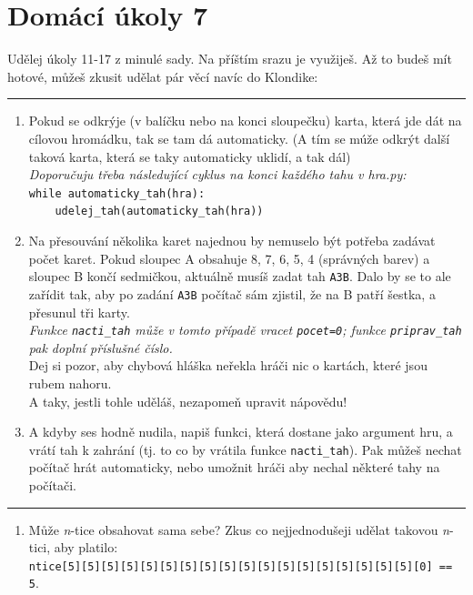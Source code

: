 \documentclass[a4paper,10pt]{article}
\newcommand\plsetno{7}
\begin{document}
\section*{Domácí úkoly \plsetno}

Udělej úkoly 11-17 z minulé sady. Na příštím srazu je využiješ.
Až to budeš mít hotové, můžeš zkusit udělat pár věcí navíc do Klondike:

\bigskip\bigskip
\hrule

\begin{enumerate}

\item Pokud se odkrýje (v balíčku nebo na konci sloupečku) karta, která jde dát
    na cílovou hromádku, tak se tam dá automaticky.
    (A tím se múže odkrýt další taková karta, která se taky automaticky
    uklidí, a tak dál)
    \\\emph{Doporučuju třeba následující cyklus na konci každého tahu v hra.py:}
    \\\verb+while automaticky_tah(hra):+
    \\\verb+    udelej_tah(automaticky_tah(hra))+

\item Na přesouvání několika karet najednou by nemuselo být potřeba zadávat
    počet karet. Pokud sloupec A obsahuje 8, 7, 6, 5, 4 (správných barev)
    a sloupec B končí sedmičkou, aktuálně musíš zadat tah \verb+A3B+.
    Dalo by se to ale zařídit tak, aby po zadání \verb+A3B+ počítač
    sám zjistil, že na B patří šestka, a přesunul tři karty.
    \\\emph{Funkce \texttt{nacti\_tah} může v tomto případě vracet \texttt{pocet=0};
            funkce \texttt{priprav\_tah} pak doplní příslušné číslo.}
    \\Dej si pozor, aby chybová hláška neřekla hráči nic o kartách, které jsou
    rubem nahoru.
    \\A taky, jestli tohle uděláš, nezapomeň upravit nápovědu!

\item A kdyby ses hodně nudila, napiš funkci, která dostane jako argument hru,
    a vrátí tah k zahrání (tj. to co by vrátila funkce \verb+nacti_tah+).
    Pak můžeš nechat počítač hrát automaticky, nebo umožnit hráči
    aby nechal některé tahy na počítači.

\end{enumerate}

\hrule

\begin{enumerate}[resume]

\item Může \emph{n}-tice obsahovat sama sebe? Zkus co nejjednodušeji udělat takovou \emph{n}-tici, aby platilo:
    \\\verb+ntice[5][5][5][5][5][5][5][5][5][5][5][5][5][5][5][5][5][5][0] == 5+.

\end{enumerate}
\end{document}
